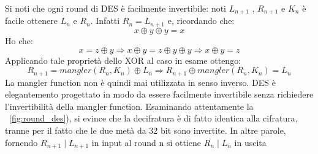Si noti che ogni round di DES è facilmente invertibile: noti $L_{n+1}$ , $R_{n+1}$ e $K_{n}$ è facile ottenere $L_{n}$ e $R_{n}$. Infatti $R_{n} = L_{n+1}$ e, ricordando che:
\begin{equation}
x \oplus y \oplus y = x 
\end{equation}
Ho che:
\begin{equation}
x  = z \oplus y \Rightarrow  x \oplus y = z \oplus y \oplus y \Rightarrow  x \oplus y = z
\end{equation}
Applicando tale proprietà dello XOR al caso in esame ottengo:
\begin{equation}
R_{n+1} = mangler(R_{n}, K_{n}) \oplus L_{n} \Rightarrow R_{n+1} \oplus mangler(R_{n}, K_{n}) = L_{n}
\end{equation}
La mangler function non è quindi mai utilizzata in senso inverso. DES è elegantemento progettato in modo da essere facilmente invertibile senza richiedere l'invertibilità della mangler function. Esaminando attentamente la \figurename ~\ref{fig:round_des}), si evince che la decifratura è di fatto identica alla cifratura, tranne per il fatto che le due metà da 32 bit sono invertite. In altre parole, fornendo $R_{n+1} \mid L_{n+1}$ in input al round n si ottiene $R_{n} \mid L_{n}$ in uscita

